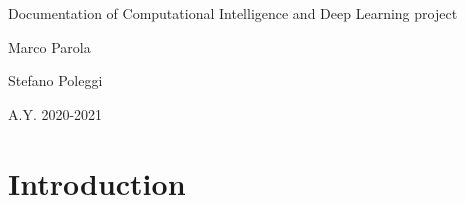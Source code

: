 \documentclass{article}
\begin{document}
\begin{titlepage}
\begin{center}
{\Huge Documentation of Computational Intelligence and Deep Learning project \par}
\vspace{18mm}
{\huge Marco Parola \par}
{\huge Stefano Poleggi \par}
\vspace{18mm}
A.Y. 2020-2021
\end{center}

\end{titlepage}

\tableofcontents\thispagestyle{empty}
\clearpage


\section{Introduction}
\end{document}
